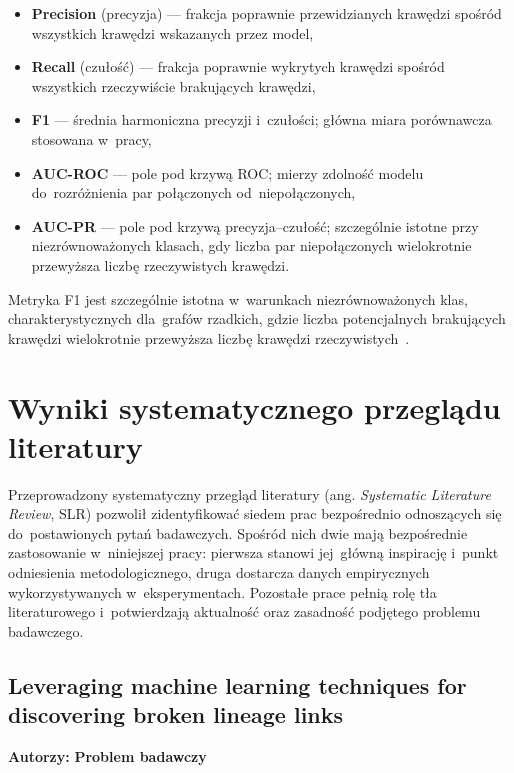 \documentclass[polish,master,a4paper,oneside]{ppfcmthesis}
\begin{document}
\begin{itemize}
  \item \textbf{Precision} (precyzja) — frakcja poprawnie przewidzianych
        krawędzi spośród wszystkich krawędzi wskazanych przez model,
  \item \textbf{Recall} (czułość) — frakcja poprawnie wykrytych krawędzi
        spośród wszystkich rzeczywiście brakujących krawędzi,
  \item \textbf{F1} — średnia harmoniczna precyzji i~czułości; główna
        miara porównawcza stosowana w~pracy,
  \item \textbf{AUC-ROC} — pole pod krzywą ROC; mierzy zdolność modelu
        do~rozróżnienia par połączonych od~niepołączonych,
  \item \textbf{AUC-PR} — pole pod krzywą precyzja–czułość; szczególnie
        istotne przy niezrównoważonych klasach, gdy liczba par niepołączonych
        wielokrotnie przewyższa liczbę rzeczywistych krawędzi.
\end{itemize}

Metryka F1 jest szczególnie istotna w~warunkach niezrównoważonych klas,
charakterystycznych dla~grafów rzadkich, gdzie liczba potencjalnych
brakujących krawędzi wielokrotnie przewyższa liczbę krawędzi
rzeczywistych~\cite{Boinski2025,KohanMarzagao2023}.



\section{Wyniki systematycznego przeglądu literatury}
\label{sec:literatura}

Przeprowadzony systematyczny przegląd literatury (ang. \emph{Systematic
Literature Review}, SLR) pozwolił zidentyfikować siedem prac bezpośrednio
odnoszących się do~postawionych pytań badawczych. Spośród nich dwie mają
bezpośrednie zastosowanie w~niniejszej pracy: pierwsza stanowi jej~główną
inspirację i~punkt odniesienia metodologicznego, druga dostarcza danych
empirycznych wykorzystywanych w~eksperymentach. Pozostałe prace pełnią rolę
tła literaturowego i~potwierdzają aktualność oraz zasadność podjętego
problemu badawczego.

\subsection{Leveraging machine learning techniques for discovering broken
lineage links}
\noindent\textbf{Autorzy: }
\noindent\textbf{Problem badawczy}
\end{document}
